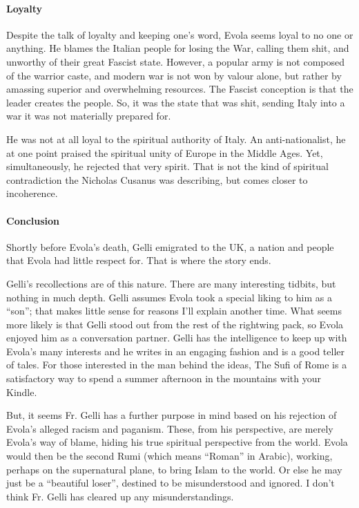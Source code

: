 \paragraph{Loyalty}


Despite the talk of loyalty and keeping one's word, Evola seems loyal to no one or anything. He blames the Italian people for losing the War, calling them shit, and unworthy of their great Fascist state. However, a popular army is not composed of the warrior caste, and modern war is not won by valour alone, but rather by amassing superior and overwhelming resources. The Fascist conception is that the leader creates the people. So, it was the state that was shit, sending Italy into a war it was not materially prepared for.

He was not at all loyal to the spiritual authority of Italy. An anti-nationalist, he at one point praised the spiritual unity of Europe in the Middle Ages. Yet, simultaneously, he rejected that very spirit. That is not the kind of spiritual contradiction the Nicholas Cusanus was describing, but comes closer to incoherence.

\paragraph{Conclusion}


Shortly before Evola's death, Gelli emigrated to the UK, a nation and people that Evola had little respect for. That is where the story ends.

Gelli's recollections are of this nature. There are many interesting tidbits, but nothing in much depth. Gelli assumes Evola took a special liking to him as a ``son''; that makes little sense for reasons I'll explain another time. What seems more likely is that Gelli stood out from the rest of the rightwing pack, so Evola enjoyed him as a conversation partner. Gelli has the intelligence to keep up with Evola's many interests and he writes in an engaging fashion and is a good teller of tales. For those interested in the man behind the ideas, The Sufi of Rome is a satisfactory way to spend a summer afternoon in the mountains with your Kindle.

But, it seems Fr. Gelli has a further purpose in mind based on his rejection of Evola's alleged racism and paganism. These, from his perspective, are merely Evola's way of blame, hiding his true spiritual perspective from the world. Evola would then be the second Rumi (which means ``Roman'' in Arabic), working, perhaps on the supernatural plane, to bring Islam to the world. Or else he may just be a ``beautiful loser'', destined to be misunderstood and ignored. I don't think Fr. Gelli has cleared up any misunderstandings.

